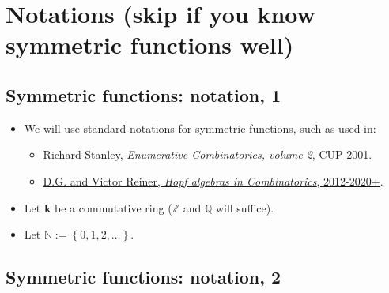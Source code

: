 \documentclass[numbers=enddot,12pt,final,onecolumn,notitlepage]{scrartcl}%
\newcommand{\0}{\phantom{c}}
\begin{document}
\section{Notations (skip if you know symmetric functions well)}

\subsection{Symmetric functions: notation, 1}

\begin{itemize}
\item We will use standard notations for symmetric functions, such as used in:

\begin{itemize}
\item {\color{red}
\href{https://www.cambridge.org/core/books/enumerative-combinatorics/D8DDDFF7E8EBF0BCFE99F5E6918CE2A8}{Richard
Stanley, \textit{Enumerative Combinatorics, volume 2}, CUP 2001}}.

\item {\color{red}
\href{http://www.cip.ifi.lmu.de/~grinberg/algebra/HopfComb-sols.pdf}{D.G. and
Victor Reiner, \textit{Hopf algebras in Combinatorics}, 2012-2020+}}.
\end{itemize}

\item Let $\mathbf{k}$ be a commutative ring ($\mathbb{Z}$ and $\mathbb{Q}$
will suffice).

\item Let $\mathbb{N}:=\left\{  0,1,2,\ldots\right\}  $.
\end{itemize}

\subsection{Symmetric functions: notation, 2}
\end{document}
